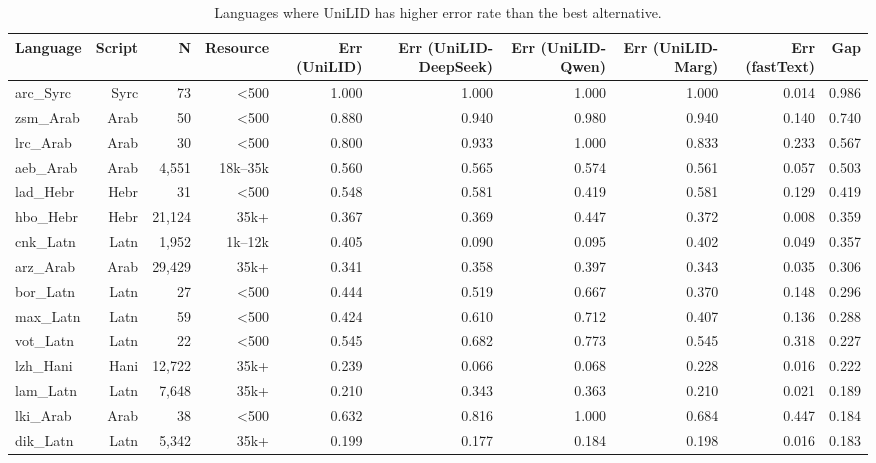 \begin{table}[htbp]
\centering
\small
\begin{tabular}{lrrrrrrrrr}
\toprule
\textbf{Language} & \textbf{Script} & \textbf{N} & \textbf{Resource} & \textbf{Err (UniLID)} & \textbf{Err (UniLID-DeepSeek)} & \textbf{Err (UniLID-Qwen)} & \textbf{Err (UniLID-Marg)} & \textbf{Err (fastText)} & \textbf{Gap} \\
\midrule
arc_Syrc & Syrc & 73 & <500 & 1.000 & 1.000 & 1.000 & 1.000 & 0.014 & 0.986 \\
zsm_Arab & Arab & 50 & <500 & 0.880 & 0.940 & 0.980 & 0.940 & 0.140 & 0.740 \\
lrc_Arab & Arab & 30 & <500 & 0.800 & 0.933 & 1.000 & 0.833 & 0.233 & 0.567 \\
aeb_Arab & Arab & 4,551 & 18k--35k & 0.560 & 0.565 & 0.574 & 0.561 & 0.057 & 0.503 \\
lad_Hebr & Hebr & 31 & <500 & 0.548 & 0.581 & 0.419 & 0.581 & 0.129 & 0.419 \\
hbo_Hebr & Hebr & 21,124 & 35k+ & 0.367 & 0.369 & 0.447 & 0.372 & 0.008 & 0.359 \\
cnk_Latn & Latn & 1,952 & 1k--12k & 0.405 & 0.090 & 0.095 & 0.402 & 0.049 & 0.357 \\
arz_Arab & Arab & 29,429 & 35k+ & 0.341 & 0.358 & 0.397 & 0.343 & 0.035 & 0.306 \\
bor_Latn & Latn & 27 & <500 & 0.444 & 0.519 & 0.667 & 0.370 & 0.148 & 0.296 \\
max_Latn & Latn & 59 & <500 & 0.424 & 0.610 & 0.712 & 0.407 & 0.136 & 0.288 \\
vot_Latn & Latn & 22 & <500 & 0.545 & 0.682 & 0.773 & 0.545 & 0.318 & 0.227 \\
lzh_Hani & Hani & 12,722 & 35k+ & 0.239 & 0.066 & 0.068 & 0.228 & 0.016 & 0.222 \\
lam_Latn & Latn & 7,648 & 35k+ & 0.210 & 0.343 & 0.363 & 0.210 & 0.021 & 0.189 \\
lki_Arab & Arab & 38 & <500 & 0.632 & 0.816 & 1.000 & 0.684 & 0.447 & 0.184 \\
dik_Latn & Latn & 5,342 & 35k+ & 0.199 & 0.177 & 0.184 & 0.198 & 0.016 & 0.183 \\
\bottomrule
\end{tabular}
\caption{Languages where UniLID has higher error rate than the best alternative.}
\label{tab:diverge-worse}
\end{table}

